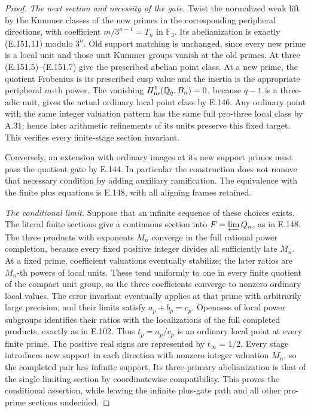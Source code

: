 \begin{proof}
\emph{The next section and necessity of the gate.}
Twist the normalized weak lift by the Kummer classes of the new
primes in the corresponding peripheral directions, with coefficient
\(m/3^{n-1}=T_n\) in \(\mathbb F_3\). Its abelianization is
exactly (E.151.11) modulo \(3^n\). Old support matching is
unchanged, since every new prime is a local unit and those unit
Kummer groups vanish at the old primes. At three (E.151.5)--(E.151.7)
give the prescribed abelian point class. At a new prime, the
quotient Frobenius is its prescribed cusp value and the inertia
is the appropriate peripheral \(m\)-th power. The vanishing
\(H^1_{\rm nr}(\mathbb Q_q,B_n)=0\), because \(q-1\) is a
three-adic unit, gives the actual ordinary local point class by
E.146. Any ordinary point with the same integer valuation pattern
has the same full pro-three local class by A.31; hence later
arithmetic refinements of its units preserve this fixed target.
This verifies every finite-stage section invariant.

Conversely, an extension with ordinary images at its new support
primes must pass the quotient gate by E.144. In particular the
construction does not remove that necessary condition by adding
auxiliary ramification. The equivalence with the finite plus
equations is E.148, with all aligning frames retained.

\emph{The conditional limit.}
Suppose that an infinite sequence of these choices exists.
The literal finite sections give a continuous section into
\(F=\varprojlim Q_n\), as in E.148. The three products with
exponents \(M_n\) converge in the full rational power completion,
because every fixed positive integer divides all sufficiently late
\(M_n\). At a fixed prime, coefficient valuations eventually
stabilize; the later ratios are \(M_n\)-th powers of local units.
These tend uniformly to one in every finite quotient of the compact
unit group, so the three coefficients converge to nonzero ordinary
local values. The error invariant eventually applies at that prime
with arbitrarily large precision, and their limits satisfy
\(a_p+b_p=c_p\). Openness of local power subgroups identifies
their ratios with the localizations of the full completed products,
exactly as in E.102. Thus \(t_p=a_p/c_p\) is an ordinary local
point at every finite prime. The positive real signs are represented
by \(t_\infty=1/2\).
Every stage introduces new support in each direction with nonzero
integer valuation \(M_n\), so the completed pair has infinite
support. Its three-primary abelianization is that of the single
limiting section by coordinatewise compatibility. This proves the
conditional assertion, while leaving the infinite plus-gate path
and all other pro-prime sections undecided.
\end{proof}
